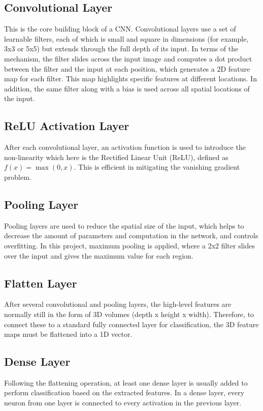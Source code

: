 \documentclass[conference]{IEEEtran}
\begin{document}
\subsection{Convolutional Layer}
This is the core building block of a CNN. Convolutional layers use a set of learnable filters, each of which is small and square in dimensions (for example, 3x3 or 5x5) but extends through the full depth of its input. In terms of the mechanism, the filter slides across the input image and computes a dot product between the filter and the input at each position, which generates a 2D feature map for each filter. This map highlights specific features at different locations. In addition, the same filter along with a bias is used across all spatial locations of the input.

\subsection{ ReLU Activation Layer}
After each convolutional layer, an activation function is used to introduce the non-linearity which here is the Rectified Linear Unit (ReLU), defined as $f(x) = \max(0, x)$. This is efficient in mitigating the vanishing gradient problem.

\subsection{Pooling Layer}
Pooling layers are used to reduce the spatial size of the input, which helps to decrease the amount of parameters and computation in the network, and controls overfitting. In this project, maximum pooling is applied, where a 2x2 filter slides over the input and gives the maximum value for each region.

\subsection{Flatten Layer}
After several convolutional and pooling layers, the high-level features are normally still in the form of 3D volumes (depth x height x width). Therefore, to connect these to a standard fully connected layer for classification, the 3D feature maps must be flattened into a 1D vector.

\subsection{Dense Layer}
Following the flattening operation, at least one dense layer is usually added to perform classification based on the extracted features. In a dense layer, every neuron from one layer is connected to every activation in the previous layer.
\end{document}
